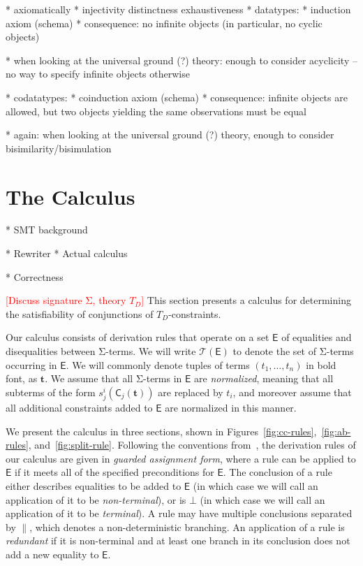 \documentclass[a4paper,oribibl,envcountsame,draft]{llncs}
\newcommand\Sig{\mathrm{\Sigma}}
\newcommand\const[1]{\textsf{#1}}
\renewcommand{\vec}[1]{\boldsymbol{#1}}
\newcommand{\Ec}{\mathsf{E}}
\newcommand{\tEc}{\mathcal{T}(\Ec)}
\newcommand{\rem}[1]{\textcolor{red}{[#1]}}
\newcommand{\thD}{T_{D}}
\begin{document}
  * axiomatically
    * injectivity
      distinctness
      exhaustiveness
    * datatypes:
      * induction axiom (schema)
        * consequence: no infinite objects (in particular, no cyclic objects)

      * when looking at the universal ground (?) theory:
        enough to consider acyclicity -- no way to specify infinite objects
        otherwise

    * codatatypes:
      * coinduction axiom (schema)
        * consequence: infinite objects are allowed, but
          two objects yielding the same observations must be equal

      * again: when looking at the universal ground (?) theory, enough to
        consider bisimilarity/bisimulation

\section{The Calculus}
\label{sec:the-calculus}

  * SMT background

  * Rewriter
  * Actual calculus

  * Correctness

\rem{Discuss signature $\Sig$, theory $\thD$}
This section presents a calculus for determining the satisfiability of conjunctions of $\thD$-constraints.

Our calculus consists of derivation rules that operate on a set $\Ec$ of equalities and disequalities between $\Sig$-terms.
We will write $\tEc$ to denote the set of $\Sig$-terms occurring in $\Ec$.
We will commonly denote tuples of terms $( t_1, \ldots, t_n )$ in bold font, as $\vec t$.
We assume that all $\Sig$-terms in $\Ec$ are \emph{normalized}, meaning that all subterms of the form $s^i_j( \const{C}_j( \vec t ) )$
are replaced by $t_i$, and moreover assume that all additional constraints added to $\Ec$ are normalized in this manner.

We present the calculus in three sections, shown in Figures~\ref{fig:cc-rules},~\ref{fig:ab-rules}, and~\ref{fig:split-rule}.
Following the conventions from~\cite{}, 
the derivation rules of our calculus are given in \emph{guarded assignment form},
where a rule can be applied to $\Ec$ if it meets all of the specified preconditions for $\Ec$.
The conclusion of a rule either describes equalities to be added to $\Ec$ (in which case we will call an application of it to be \emph{non-terminal}),
or is $\bot$ (in which case we will call an application of it to be \emph{terminal}).
A rule may have multiple conclusions separated by $\parallel$, which denotes a non-deterministic branching.
An application of a rule is \emph{redundant} if it is non-terminal and at least one branch in its conclusion does not add a new equality to $\Ec$.
\end{document}
